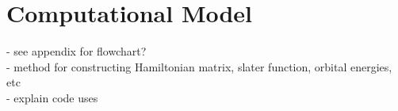 \chapter{Computational Model}\label{ch:Model}

- see appendix for flowchart? \\
- method for constructing Hamiltonian matrix, slater function, orbital energies, etc \\
- explain code uses \\
